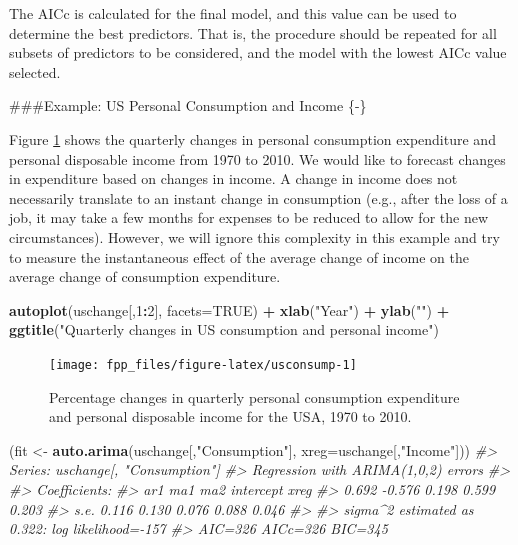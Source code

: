 \documentclass[]{book}
\newenvironment{Shaded}{\begin{snugshade}}{\end{snugshade}}
\newcommand{\CommentTok}[1]{\textcolor[rgb]{0.56,0.35,0.01}{\textit{#1}}}
\newcommand{\DataTypeTok}[1]{\textcolor[rgb]{0.13,0.29,0.53}{#1}}
\newcommand{\DecValTok}[1]{\textcolor[rgb]{0.00,0.00,0.81}{#1}}
\newcommand{\KeywordTok}[1]{\textcolor[rgb]{0.13,0.29,0.53}{\textbf{#1}}}
\newcommand{\NormalTok}[1]{#1}
\newcommand{\OperatorTok}[1]{\textcolor[rgb]{0.81,0.36,0.00}{\textbf{#1}}}
\newcommand{\OtherTok}[1]{\textcolor[rgb]{0.56,0.35,0.01}{#1}}
\newcommand{\StringTok}[1]{\textcolor[rgb]{0.31,0.60,0.02}{#1}}
\begin{document}
The AICc is calculated for the final model, and this value can be used to determine the best predictors. That is, the procedure should be repeated for all subsets of predictors to be considered, and the model with the lowest AICc value selected.

\#\#\#Example: US Personal Consumption and Income \{-\}

Figure \ref{fig:usconsump} shows the quarterly changes in personal consumption expenditure and personal disposable income from 1970 to 2010. We would like to forecast changes in expenditure based on changes in income. A change in income does not necessarily translate to an instant change in consumption (e.g., after the loss of a job, it may take a few months for expenses to be reduced to allow for the new circumstances). However, we will ignore this complexity in this example and try to measure the instantaneous effect of the average change of income on the average change of consumption expenditure.

\begin{Shaded}
\begin{Highlighting}[]
\KeywordTok{autoplot}\NormalTok{(uschange[,}\DecValTok{1}\OperatorTok{:}\DecValTok{2}\NormalTok{], }\DataTypeTok{facets=}\OtherTok{TRUE}\NormalTok{) }\OperatorTok{+}
\StringTok{  }\KeywordTok{xlab}\NormalTok{(}\StringTok{"Year"}\NormalTok{) }\OperatorTok{+}\StringTok{ }\KeywordTok{ylab}\NormalTok{(}\StringTok{""}\NormalTok{) }\OperatorTok{+}\StringTok{ }
\StringTok{  }\KeywordTok{ggtitle}\NormalTok{(}\StringTok{"Quarterly changes in US consumption and personal income"}\NormalTok{)}
\end{Highlighting}
\end{Shaded}

\begin{figure}

{\centering \texttt{[image: fpp\_files/figure-latex/usconsump-1]} 

}

\caption{Percentage changes in quarterly personal consumption expenditure and personal disposable income for the USA, 1970 to 2010.}\label{fig:usconsump}
\end{figure}

\begin{Shaded}
\begin{Highlighting}[]
\NormalTok{(fit <-}\StringTok{ }\KeywordTok{auto.arima}\NormalTok{(uschange[,}\StringTok{"Consumption"}\NormalTok{], }\DataTypeTok{xreg=}\NormalTok{uschange[,}\StringTok{"Income"}\NormalTok{]))}
\CommentTok{#> Series: uschange[, "Consumption"] }
\CommentTok{#> Regression with ARIMA(1,0,2) errors }
\CommentTok{#> }
\CommentTok{#> Coefficients:}
\CommentTok{#>         ar1     ma1    ma2  intercept   xreg}
\CommentTok{#>       0.692  -0.576  0.198      0.599  0.203}
\CommentTok{#> s.e.  0.116   0.130  0.076      0.088  0.046}
\CommentTok{#> }
\CommentTok{#> sigma^2 estimated as 0.322:  log likelihood=-157}
\CommentTok{#> AIC=326   AICc=326   BIC=345}
\end{Highlighting}
\end{Shaded}
\end{document}
